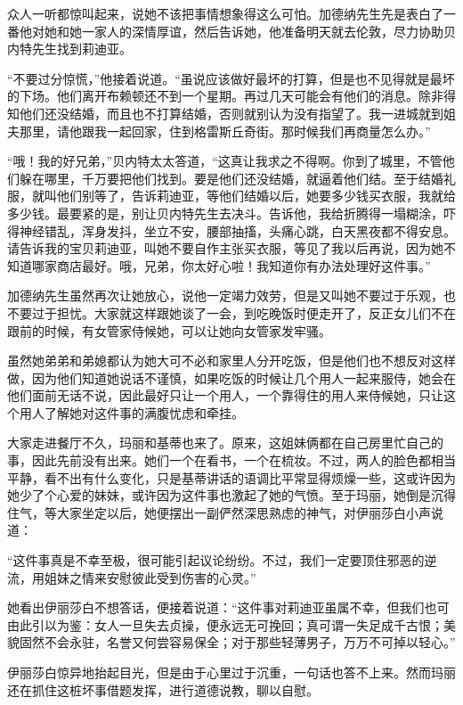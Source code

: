 \par 众人一听都惊叫起来，说她不该把事情想象得这么可怕。加德纳先生先是表白了一番他对她和她一家人的深情厚谊，然后告诉她，他准备明天就去伦敦，尽力协助贝内特先生找到莉迪亚。
\par “不要过分惊慌，”他接着说道。“虽说应该做好最坏的打算，但是也不见得就是最坏的下场。他们离开布赖顿还不到一个星期。再过几天可能会有他们的消息。除非得知他们还没结婚，而且也不打算结婚，否则就别认为没有指望了。我一进城就到姐夫那里，请他跟我一起回家，住到格雷斯丘奇街。那时候我们再商量怎么办。”
\par “哦！我的好兄弟，”贝内特太太答道，“这真让我求之不得啊。你到了城里，不管他们躲在哪里，千万要把他们找到。要是他们还没结婚，就逼着他们结。至于结婚礼服，就叫他们别等了，告诉莉迪亚，等他们结婚以后，她要多少钱买衣服，我就给多少钱。最要紧的是，别让贝内特先生去决斗。告诉他，我给折腾得一塌糊涂，吓得神经错乱，浑身发抖，坐立不安，腰部抽搐，头痛心跳，白天黑夜都不得安息。请告诉我的宝贝莉迪亚，叫她不要自作主张买衣服，等见了我以后再说，因为她不知道哪家商店最好。哦，兄弟，你太好心啦！我知道你有办法处理好这件事。”
\par 加德纳先生虽然再次让她放心，说他一定竭力效劳，但是又叫她不要过于乐观，也不要过于担忧。大家就这样跟她谈了一会，到吃晚饭时便走开了，反正女儿们不在跟前的时候，有女管家侍候她，可以让她向女管家发牢骚。
\par 虽然她弟弟和弟媳都认为她大可不必和家里人分开吃饭，但是他们也不想反对这样做，因为他们知道她说话不谨慎，如果吃饭的时候让几个用人一起来服侍，她会在他们面前无话不说，因此最好只让一个用人，一个靠得住的用人来侍候她，只让这个用人了解她对这件事的满腹忧虑和牵挂。
\par 大家走进餐厅不久，玛丽和基蒂也来了。原来，这姐妹俩都在自己房里忙自己的事，因此先前没有出来。她们一个在看书，一个在梳妆。不过，两人的脸色都相当平静，看不出有什么变化，只是基蒂讲话的语调比平常显得烦燥一些，这或许因为她少了个心爱的妹妹，或许因为这件事也激起了她的气愤。至于玛丽，她倒是沉得住气，等大家坐定以后，她便摆出一副俨然深思熟虑的神气，对伊丽莎白小声说道：
\par “这件事真是不幸至极，很可能引起议论纷纷。不过，我们一定要顶住邪恶的逆流，用姐妹之情来安慰彼此受到伤害的心灵。”
\par 她看出伊丽莎白不想答话，便接着说道：“这件事对莉迪亚虽属不幸，但我们也可由此引以为鉴：女人一旦失去贞操，便永远无可挽回；真可谓一失足成千古恨；美貌固然不会永驻，名誉又何尝容易保全；对于那些轻薄男子，万万不可掉以轻心。”
\par 伊丽莎白惊异地抬起目光，但是由于心里过于沉重，一句话也答不上来。然而玛丽还在抓住这桩坏事借题发挥，进行道德说教，聊以自慰。
